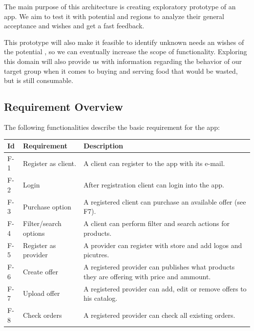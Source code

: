 The main purpose of this architecture is creating exploratory prototype of an \gls{app}. We aim to test it with potential 
 and regions to analyze their general acceptance and wishes \cite{refbook:DSHC} and get a fast feedback. 

This prototype will also make it feasible to identify unknown needs an wishes of the potential , so we 
can eventually increase the scope of functionality. Exploring this domain will also provide us with information regarding 
the behavior of our target group when it comes to buying and serving food that would be wasted, but is still consumable.

\subsection{Requirement Overview} \label{Requirement_Overview}

The following functionalities describe the basic requirement for the \gls{app}:

\begin{table}[H]
    \begin{tabularx}{\textwidth}{llX}
    \toprule
    Id & Requirement & Description  \\
    \midrule
    F-1 & Register as \gls{client}. & A \gls{client} can register to the app with its e-mail.\\
    F-2 & Login & After registration \gls{client} can login into the app. \\
    F-3 & Purchase option & A registered \gls{client} can purchase an available offer (see F7).\\
    F-4 & Filter/search options & A \gls{client} can perform filter and search actions for products.\\
    F-5 & Register as \gls{provider} & A \gls{provider} can register with store and add logos and picutres.\\
    F-6 & Create offer & A registered \gls{provider} can publishes what products they are offering with price 
    and ammount. \\
    F-7 & Upload offer & A registered \gls{provider} can add, edit or remove offers to his catalog.\\
    F-8 & Check orders & A registered \gls{provider} can check all existing orders.\\
    \bottomrule
    \end{tabularx}
\end{table}

